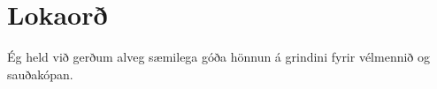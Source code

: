 \section{Lokaorð}
Ég held við gerðum alveg sæmilega góða hönnun á grindini fyrir vélmennið og sauðakópan.